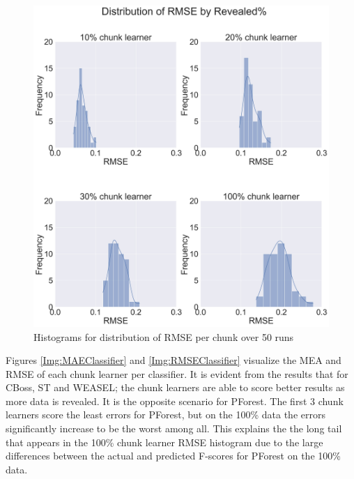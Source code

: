   \begin{figure}[hp!]
    \captionsetup{justification=raggedright}
    \centering
    \includegraphics[width=\textwidth]{hist_rmse.jpg}
    \centering
    \caption{Histograms for distribution of RMSE per chunk over 50 runs}
    \label{Img:HistogramRMSE}
  \end{figure}

Figures \ref{Img:MAEClassifier} and \ref{Img:RMSEClassifier} visualize the MEA and RMSE of each chunk learner per classifier.
It is evident from the results that for CBoss, ST and WEASEL; the chunk learners are able to score better results as more data is revealed.
It is the opposite scenario for PForest. The first 3 chunk learners score the least errors for PForest, but on the 100\% data the errors significantly increase to be the worst among all.
This explains the the long tail that appears in the 100\% chunk learner RMSE histogram due to the large differences between the actual and predicted F-scores for PForest on the 100\% data.

